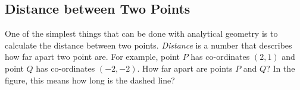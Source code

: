             \subsection{ Distance between Two Points}
            \nopagebreak
            \label{m39107*id66786}One of the simplest things that can be done with analytical geometry is to calculate the distance between two points. \textsl{Distance} is a number that describes how far apart two point are. For example, point \begin{math}P\end{math} has co-ordinates \begin{math}\left(2,1\right)\end{math} and point \begin{math}Q\end{math} has co-ordinates \begin{math}\left(-2,-2\right)\end{math}. How far apart are points \begin{math}P\end{math} and \begin{math}Q\end{math}? In the figure, this means how long is the dashed line?\par 
        
    \setcounter{subfigure}{0}



